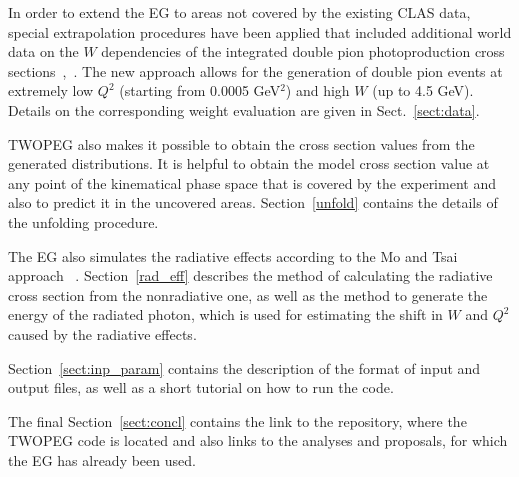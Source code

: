 In order to extend the EG to areas not covered by the existing CLAS data, special extrapolation procedures have been applied that included additional  world data on the $W$ dependencies of the integrated double pion photoproduction cross sections~\cite{Wu:2005wf},~\cite{ABBHHM:1968aa}. The new approach allows for the generation of double pion events at extremely low $Q^2$ (starting from 0.0005 GeV$^2$) and high $W$ (up to 4.5 GeV). Details on the corresponding weight evaluation are given in Sect.~\ref{sect:data}.

TWOPEG also makes it possible to obtain the cross section values from the generated distributions. It is helpful to obtain the model cross section value at any point of the kinematical phase space that is covered by the experiment and also to predict it in the uncovered areas. Section~\ref{unfold} contains the details of the unfolding procedure. 

The EG also simulates the radiative effects according to the Mo and Tsai approach ~\cite{Mo:1968cg}. Section~\ref{rad_eff} describes the method of calculating the radiative cross section from the nonradiative one, as well as the method to generate the energy of the radiated photon, which is used for estimating the shift in $W$ and $Q^2$ caused by the radiative effects.

Section~\ref{sect:inp_param} contains the description of the format of input and output files, as well as a short tutorial on how to run the code.

The final Section~\ref{sect:concl} contains the link to the repository, where the TWOPEG code is located and also links to the analyses and proposals, for which the EG has already been used. 




 




